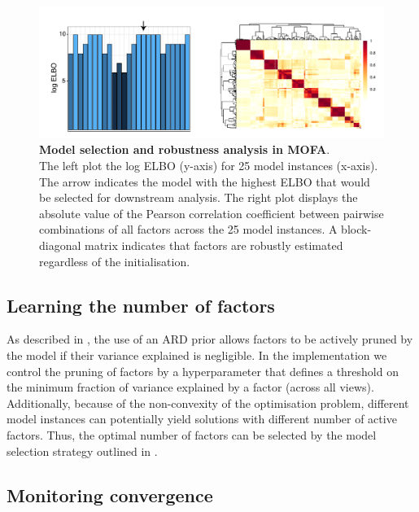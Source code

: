 \begin{figure}[H]
	\centering 	
	\includegraphics[width=1.0\textwidth]{MOFA_robustness}
	\caption{ \textbf{Model selection and robustness analysis in MOFA}.\\
	The left plot the log ELBO (y-axis) for 25 model instances (x-axis). The arrow indicates the model with the highest ELBO that would be selected for downstream analysis. The right plot displays the absolute value of the Pearson correlation coefficient between pairwise combinations of all factors across the 25 model instances. A block-diagonal matrix indicates that factors are robustly estimated regardless of the initialisation.}
	\label{fig:MOFA_robustness}
\end{figure}


\subsection{Learning the number of factors} \label{section:mofa_nfactors}

As described in , the use of an ARD prior allows factors to be actively pruned by the model if their variance explained is negligible. In the implementation we control the pruning of factors by a hyperparameter that defines a threshold on the minimum fraction of variance explained by a factor (across all views). Additionally, because of the non-convexity of the optimisation problem, different model instances can potentially yield solutions with different number of active factors. Thus, the optimal number of factors can be selected by the model selection strategy outlined in .

\subsection{Monitoring convergence}

